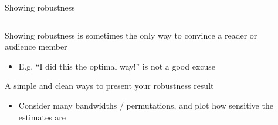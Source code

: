 \documentclass[notes,11pt, aspectratio=169]{beamer}
\newenvironment{wideitemize}{\itemize\addtolength{\itemsep}{10pt}}{\enditemize}
\begin{document}
\begin{frame}{Showing robustness}
    \begin{columns}[onlytextwidth, T] %
      \begin{column}{.5\textwidth}
        \begin{wideitemize}
        \item Showing robustness is sometimes the only way to convince
          a reader or audience member
          \begin{itemize}
          \item E.g. ``I did this the optimal way!'' is not a good excuse
          \end{itemize}
        \item A simple and clean ways to present your robustness result
          \begin{itemize}
          \item Consider many bandwidths / permutations, and plot how sensitive the estimates are            
          \end{itemize}
        \end{wideitemize}
      \end{column}%
      \hfill%
      \begin{column}{.5\textwidth}
                               \end{column}%
    \end{columns}
\end{frame}
\end{document}
